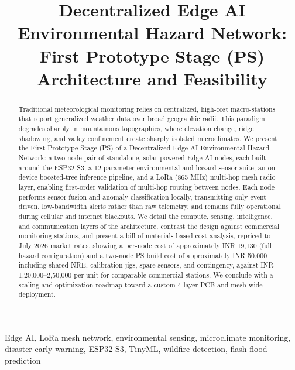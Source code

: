 \documentclass[conference]{IEEEtran}
\begin{document}
\title{Decentralized Edge AI Environmental Hazard Network: \\
First Prototype Stage (PS) Architecture and Feasibility}

\author{
}

\maketitle

\begin{abstract}
Traditional meteorological monitoring relies on centralized, high-cost
macro-stations that report generalized weather data over broad geographic
radii. This paradigm degrades sharply in mountainous topographies, where
elevation change, ridge shadowing, and valley confinement create sharply
isolated microclimates. We present the First Prototype Stage (PS) of a
Decentralized Edge AI Environmental Hazard Network: a two-node pair of
standalone, solar-powered Edge AI nodes, each built around the ESP32-S3, a
12-parameter environmental and hazard sensor suite, an on-device
boosted-tree inference pipeline, and a LoRa (865 MHz) multi-hop mesh radio
layer, enabling first-order validation of multi-hop routing between nodes.
Each node performs
sensor fusion and anomaly classification locally, transmitting only
event-driven, low-bandwidth alerts rather than raw telemetry, and remains
fully operational during cellular and internet blackouts. We detail the
compute, sensing, intelligence, and communication layers of the
architecture, contrast the design against commercial monitoring stations,
and present a bill-of-materials-based cost analysis, repriced to July 2026
market rates, showing a per-node cost of approximately INR 19,130 (full
hazard configuration) and a two-node PS build cost of approximately INR
50,000 including shared NRE, calibration jigs, spare sensors, and
contingency, against INR 1,20,000--2,50,000 per unit for comparable
commercial stations. We conclude with a scaling and optimization roadmap
toward a custom 4-layer PCB and mesh-wide deployment.
\end{abstract}

\begin{IEEEkeywords}
Edge AI, LoRa mesh network, environmental sensing, microclimate monitoring,
disaster early-warning, ESP32-S3, TinyML, wildfire detection, flash flood
prediction
\end{IEEEkeywords}
\end{document}
